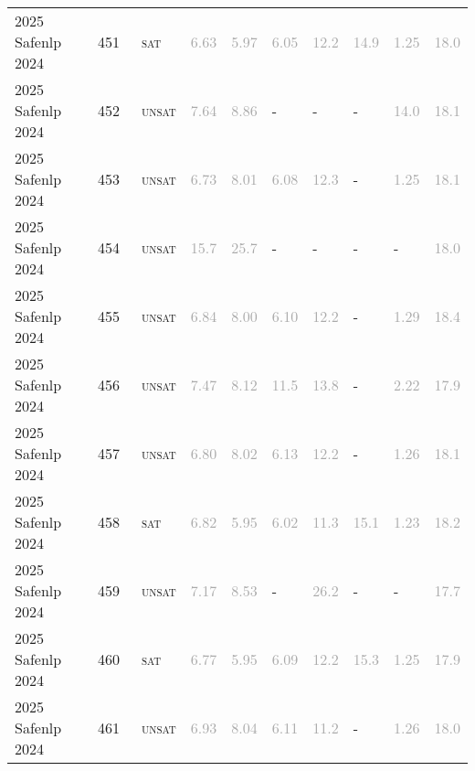 \begin{center}
{\begin{longtable}{@{}llllllllll@{}}
2025 Safenlp 2024 & 451 & ~\textsc{sat} & \textcolor{darkgray}{6.63} & \textcolor{darkgray}{5.97} & \textcolor{darkgray}{6.05} & \textcolor{darkgray}{12.2} & \textcolor{darkgray}{14.9} & \textcolor{darkgray}{1.25} & \textcolor{darkgray}{18.0} \\
2025 Safenlp 2024 & 452 & ~\textsc{unsat} & \textcolor{darkgray}{7.64} & \textcolor{darkgray}{8.86} & - & - & - & \textcolor{darkgray}{14.0} & \textcolor{darkgray}{18.1} \\
2025 Safenlp 2024 & 453 & ~\textsc{unsat} & \textcolor{darkgray}{6.73} & \textcolor{darkgray}{8.01} & \textcolor{darkgray}{6.08} & \textcolor{darkgray}{12.3} & - & \textcolor{darkgray}{1.25} & \textcolor{darkgray}{18.1} \\
2025 Safenlp 2024 & 454 & ~\textsc{unsat} & \textcolor{darkgray}{15.7} & \textcolor{darkgray}{25.7} & - & - & - & - & \textcolor{darkgray}{18.0} \\
2025 Safenlp 2024 & 455 & ~\textsc{unsat} & \textcolor{darkgray}{6.84} & \textcolor{darkgray}{8.00} & \textcolor{darkgray}{6.10} & \textcolor{darkgray}{12.2} & - & \textcolor{darkgray}{1.29} & \textcolor{darkgray}{18.4} \\
2025 Safenlp 2024 & 456 & ~\textsc{unsat} & \textcolor{darkgray}{7.47} & \textcolor{darkgray}{8.12} & \textcolor{darkgray}{11.5} & \textcolor{darkgray}{13.8} & - & \textcolor{darkgray}{2.22} & \textcolor{darkgray}{17.9} \\
2025 Safenlp 2024 & 457 & ~\textsc{unsat} & \textcolor{darkgray}{6.80} & \textcolor{darkgray}{8.02} & \textcolor{darkgray}{6.13} & \textcolor{darkgray}{12.2} & - & \textcolor{darkgray}{1.26} & \textcolor{darkgray}{18.1} \\
2025 Safenlp 2024 & 458 & ~\textsc{sat} & \textcolor{darkgray}{6.82} & \textcolor{darkgray}{5.95} & \textcolor{darkgray}{6.02} & \textcolor{darkgray}{11.3} & \textcolor{darkgray}{15.1} & \textcolor{darkgray}{1.23} & \textcolor{darkgray}{18.2} \\
2025 Safenlp 2024 & 459 & ~\textsc{unsat} & \textcolor{darkgray}{7.17} & \textcolor{darkgray}{8.53} & - & \textcolor{darkgray}{26.2} & - & - & \textcolor{darkgray}{17.7} \\
2025 Safenlp 2024 & 460 & ~\textsc{sat} & \textcolor{darkgray}{6.77} & \textcolor{darkgray}{5.95} & \textcolor{darkgray}{6.09} & \textcolor{darkgray}{12.2} & \textcolor{darkgray}{15.3} & \textcolor{darkgray}{1.25} & \textcolor{darkgray}{17.9} \\
2025 Safenlp 2024 & 461 & ~\textsc{unsat} & \textcolor{darkgray}{6.93} & \textcolor{darkgray}{8.04} & \textcolor{darkgray}{6.11} & \textcolor{darkgray}{11.2} & - & \textcolor{darkgray}{1.26} & \textcolor{darkgray}{18.0} \\

\end{longtable}}
\end{center}
